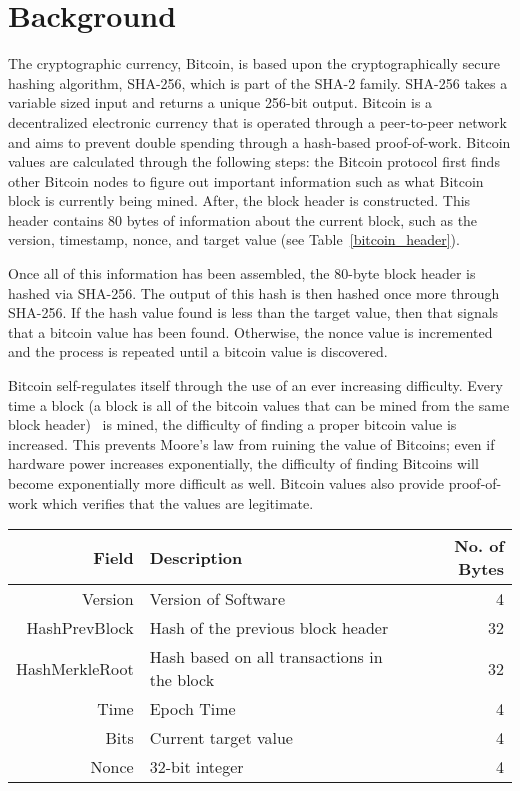 \section{Background}

The cryptographic currency, Bitcoin, is based upon the cryptographically secure hashing algorithm, SHA-256, which is part of the SHA-2 family.
SHA-256 takes a variable sized input and returns a unique 256-bit output.
Bitcoin is a decentralized electronic currency that is operated through a peer-to-peer network and aims to prevent double spending through a hash-based proof-of-work.
Bitcoin values are calculated through the following steps: the Bitcoin protocol first finds other Bitcoin nodes to figure out important information such as what Bitcoin block is currently being mined.
After, the block header is constructed.
This header contains 80 bytes of information about the current block, such as the version, timestamp, nonce, and target value (see Table~\ref{bitcoin_header}).

Once all of this information has been assembled, the 80-byte block header is hashed via SHA-256.
The output of this hash is then hashed once more through SHA-256.
If the hash value found is less than the target value, then that signals that a bitcoin value has been found.
Otherwise, the nonce value is incremented and the process is repeated until a bitcoin value is discovered.

Bitcoin self-regulates itself through the use of an ever increasing difficulty.
Every time a block (a block is all of the bitcoin values that can be mined from the same block header)  is mined, the difficulty of finding a proper bitcoin value is increased.
This prevents Moore’s law from ruining the value of Bitcoins; even if hardware power increases exponentially, the difficulty of finding Bitcoins will become exponentially more difficult as well.
Bitcoin values also provide proof-of-work which verifies that the values are legitimate.

\begin{table*}
    \centering
\label{bitcoin_header}
\begin{tabular}{r| p{9cm} | r}
  \hline
  \hline
  {\bf Field} & {\bf Description} & {\bf No. of Bytes} \\
  \hline
  Version & Version of Software & 4 \\
  HashPrevBlock & Hash of the previous block header & 32 \\
  HashMerkleRoot & Hash based on all transactions in the block & 32 \\
  Time & Epoch Time & 4 \\
  Bits & Current target value & 4 \\
  Nonce & 32-bit integer & 4 \\
  \hline
\end{tabular}
\caption{The block header for a Bitcoin. These blocks are hashed twice using SHA-256 to determine whether or not the header (with a given nonce) represents a valid Bitcoin. Because the required value becomes harder and harder to match, more and more computation is required to mine additional Bitcoins.}
\end{table*}

